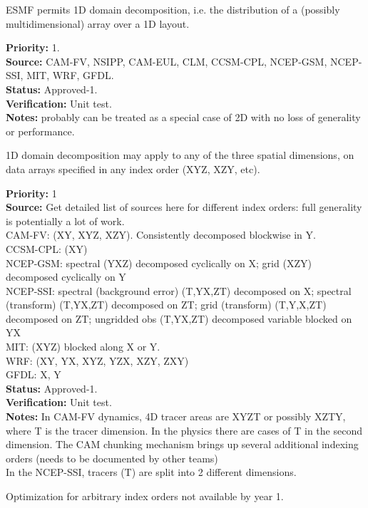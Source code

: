 
ESMF permits 1D domain decomposition, i.e. the distribution of a
(possibly multidimensional) array over a 1D layout.

\begin{reqlist}
{\bf Priority:} 1.\\ 
{\bf Source:} CAM-FV, NSIPP, CAM-EUL, CLM, CCSM-CPL, NCEP-GSM, NCEP-SSI, MIT, WRF, GFDL. \\
{\bf Status:} Approved-1. \\
{\bf Verification:} Unit test. \\
{\bf Notes:} probably can be treated as a special case of 2D with no
  loss of generality or performance.
\end{reqlist}


1D domain decomposition may apply to any of the three spatial
dimensions, on data arrays specified in any index order (XYZ, XZY,
etc).

\begin{reqlist}
{\bf Priority:} 1 \\
{\bf Source:} Get detailed list of sources here for different index
  orders: full generality is potentially a lot of work. \\
 CAM-FV: (XY, XYZ, XZY).  Consistently decomposed blockwise in Y. \\
 CCSM-CPL: (XY) \\
 NCEP-GSM: spectral (YXZ) decomposed cyclically on X;
           grid (XZY) decomposed cyclically on Y \\
 NCEP-SSI: spectral (background error) (T,YX,ZT) decomposed on X;
           spectral (transform) (T,YX,ZT) decomposed on ZT;
           grid (transform) (T,Y,X,ZT) decomposed on ZT;
           ungridded obs (T,YX,ZT) decomposed variable blocked on YX \\
 MIT: (XYZ) blocked along X or Y. \\
 WRF: (XY, YX, XYZ, YZX, XZY, ZXY) \\
 GFDL: X, Y \\
{\bf Status:} Approved-1. \\
{\bf Verification:} Unit test. \\
{\bf Notes:}  In CAM-FV dynamics, 4D tracer areas are XYZT or
        possibly XZTY, where T is the tracer dimension.  In the physics
        there are cases of T in the second dimension.  The CAM
        chunking mechanism brings up several additional indexing
        orders (needs to be documented by other teams) \\
        In the NCEP-SSI, tracers (T) are split into 2 different
        dimensions.

        Optimization for arbitrary index orders not available by year 1.
\end{reqlist}

